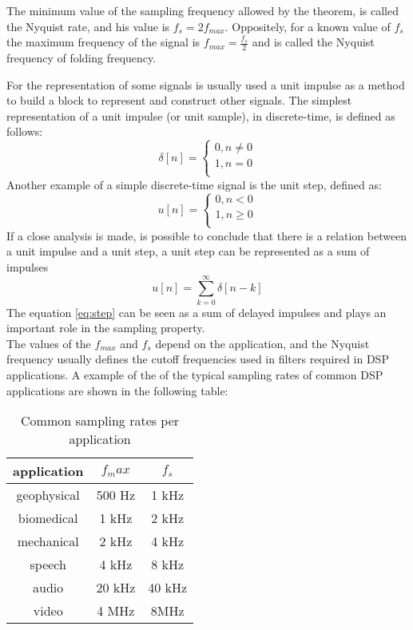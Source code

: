 The minimum value of the sampling frequency allowed by the theorem, is called the Nyquist rate, and his value is $f_s = 2f_{max}$. Oppositely, for a known value of $f_s$ the maximum frequency of the signal is $f_{max}=\frac{f_s}{2}$ and is called the Nyquist frequency of folding frequency.

For the representation of some signals is usually used a unit impulse as a method to build a block to represent and construct other signals. The simplest representation of a unit impulse (or unit sample), in discrete-time, is defined as follows:
\begin{equation}
    \delta[n] = \left\{ \begin{matrix} 
    0, n \ne 0\\
    1, n = 0\\
    \end{matrix}\right.
\end{equation}
Another example of a simple discrete-time signal is the unit step, defined as:
\begin{equation}
    u[n] = \left\{ \begin{matrix} 
    0, n < 0\\
    1, n \geq 0\\
    \end{matrix}\right.
\end{equation}
If a close analysis is made, is possible to conclude that there is a relation between a unit impulse and a unit step, a unit step can be represented as a sum of impulses
\begin{equation}\label{eq:step}
    u[n] = \sum_{k=0}^{\infty}\delta[n-k]
\end{equation}
The equation \ref{eq:step} can be seen as a sum of delayed impulses and plays an important role in the sampling property.\\
The values of the $f_{max}$ and $f_s$ depend on the application, and the Nyquist frequency usually defines the cutoff frequencies used in filters required in DSP applications. A example of the of the typical sampling rates of common DSP applications are shown in the following table:   
\begin{table}[!htpb]
   \centering
   \begin{tabular}{|c|c|c|} \toprule
       {application}&{$f_max$}&{$f_s$}\\
       \toprule
       {geophysical}&{500 Hz}&{1 kHz}\\
       {biomedical}&{1 kHz}&{2 kHz}\\
       {mechanical}&{2 kHz}&{4 kHz}\\
       {speech}&{4 kHz}&{8 kHz}\\
       {audio}&{20 kHz}&{40 kHz}\\
       {video}&{4 MHz}&{8MHz}\\
       \bottomrule
   \end{tabular} 
   \caption{Common sampling rates per application\cite{orfanidisIntroductionSignalProcessing1996}}  
    \label{tab:sampRat}     
\end{table} 

